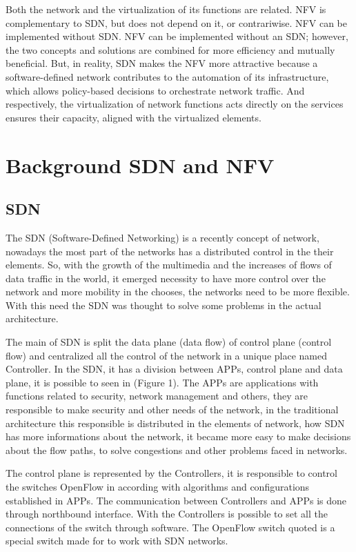 \documentclass[12pt]{article}
\begin{document}
Both the network and the virtualization of its functions are related. NFV is complementary to SDN, but does not depend on it, or contrariwise. NFV can be implemented without SDN. NFV can be implemented without an SDN; however, the two concepts and solutions are combined for more efficiency and mutually beneficial. But, in reality, SDN makes the NFV more attractive because a software-defined network contributes to the automation of its infrastructure, which allows policy-based decisions to orchestrate network traffic. And respectively, the virtualization of network functions acts directly on the services ensures their capacity, aligned with the virtualized elements.


\section{Background SDN and NFV} \label{sec:sdn}
\subsection{SDN}

The SDN (Software-Defined Networking) is a recently concept of network, nowadays the most part of the networks has a distributed control in the their elements. So, with the growth of the multimedia and the increases of flows of data traffic in the world, it emerged necessity to have more control over the network and more mobility in the chooses, the networks need to be more flexible. With this need the SDN was thought to solve some problems in the actual architecture.

The main of SDN is split the data plane (data flow) of control plane (control flow) and centralized all the control of the network in a unique place named Controller. In the SDN, it has a division between APPs, control plane and data plane, it is possible to seen in (Figure 1). The APPs are applications with functions related to security, network management and others, they are responsible to make security and other needs of the network, in the traditional architecture this responsible is distributed in the elements of network, how SDN has more informations about the network, it became more easy to make decisions about the flow paths, to solve congestions and other problems faced in networks.

The control plane is represented by the Controllers, it is responsible to control the switches OpenFlow in according with algorithms and configurations established in APPs. The communication between Controllers and APPs is done through northbound interface. With the Controllers is possible to set all the connections of the switch through software. The OpenFlow switch quoted is a special switch made for to work with SDN networks.
\end{document}
